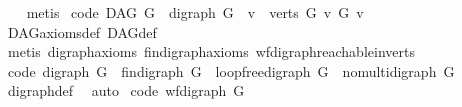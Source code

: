 \begin{isabellebody}
\ \ \isamarkupfalse%
\ metis%
\endisatagproof
{\isafoldproof}%
%
\isadelimproof
\isanewline
%
\endisadelimproof
\isanewline
{}\isamarkupfalse%
\ {\isacharbrackleft}{\kern0pt}code{\isacharbrackright}{\kern0pt}{\isacharcolon}{\kern0pt}\ {\isachardoublequoteopen}DAG\ G\ {\isacharequal}{\kern0pt}\ {\isacharparenleft}{\kern0pt}digraph\ G\ {\isasymand}\ {\isacharparenleft}{\kern0pt}{\isasymforall}v\ {\isasymin}\ verts\ G{\isachardot}{\kern0pt}\ {\isasymnot}{\isacharparenleft}{\kern0pt}v\ {\isasymrightarrow}\isactrlsup {\isacharplus}{\kern0pt}\isactrlbsub G\isactrlesub \ v{\isacharparenright}{\kern0pt}{\isacharparenright}{\kern0pt}{\isacharparenright}{\kern0pt}{\isachardoublequoteclose}\isanewline
%
\isadelimproof
\ \ %
\endisadelimproof
%
\isatagproof
{}\isamarkupfalse%
\ DAG{\isacharunderscore}{\kern0pt}axioms{\isacharunderscore}{\kern0pt}def\ DAG{\isacharunderscore}{\kern0pt}def\isanewline
\ \ \isamarkupfalse%
\ {\isacharparenleft}{\kern0pt}metis\ digraph{\isachardot}{\kern0pt}axioms{\isacharparenleft}{\kern0pt}{}{\isacharparenright}{\kern0pt}\ fin{\isacharunderscore}{\kern0pt}digraph{\isachardot}{\kern0pt}axioms{\isacharparenleft}{\kern0pt}{}{\isacharparenright}{\kern0pt}\ wf{\isacharunderscore}{\kern0pt}digraph{\isachardot}{\kern0pt}reachable{}{\isacharunderscore}{\kern0pt}in{\isacharunderscore}{\kern0pt}verts{\isacharparenleft}{\kern0pt}{}{\isacharparenright}{\kern0pt}{\isacharparenright}{\kern0pt}%
\endisatagproof
{\isafoldproof}%
%
\isadelimproof
\ \isanewline
%
\endisadelimproof
\isanewline
{}\isamarkupfalse%
\ {\isacharbrackleft}{\kern0pt}code{\isacharbrackright}{\kern0pt}{\isacharcolon}{\kern0pt}\ {\isachardoublequoteopen}digraph\ G\ {\isacharequal}{\kern0pt}\ {\isacharparenleft}{\kern0pt}fin{\isacharunderscore}{\kern0pt}digraph\ G\ {\isasymand}\ loopfree{\isacharunderscore}{\kern0pt}digraph\ G\ {\isasymand}\ nomulti{\isacharunderscore}{\kern0pt}digraph\ G{\isacharparenright}{\kern0pt}{\isachardoublequoteclose}\isanewline
%
\isadelimproof
\ \ %
\endisadelimproof
%
\isatagproof
{}\isamarkupfalse%
\ digraph{\isacharunderscore}{\kern0pt}def\ \isamarkupfalse%
\ auto%
\endisatagproof
{\isafoldproof}%
%
\isadelimproof
\isanewline
%
\endisadelimproof
\isanewline
{}\isamarkupfalse%
\ {\isacharbrackleft}{\kern0pt}code{\isacharbrackright}{\kern0pt}{\isacharcolon}{\kern0pt}\ {\isachardoublequoteopen}wf{\isacharunderscore}{\kern0pt}digraph\ G\ {\isacharequal}{\kern0pt}\ {\isacharparenleft}{\kern0pt}\isanewline

\end{isabellebody}
